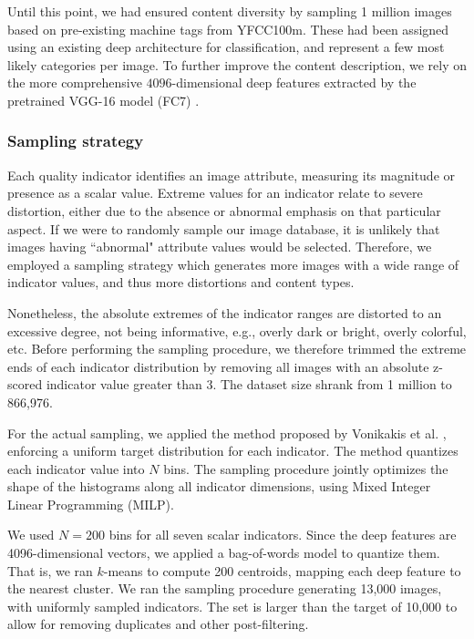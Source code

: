 \documentclass{article}
\begin{document}
Until this point, we had ensured content diversity by sampling 1 million images based on pre-existing machine tags from YFCC100m. These had been assigned using an existing deep architecture for classification, and represent a few most likely categories per image. To further improve the content description, we rely on the more comprehensive $4096$-dimensional deep features extracted by the pretrained VGG-16 model (FC7) \cite{Simonyan:14c}.





\subsubsection{Sampling strategy}
Each quality indicator identifies an image attribute, measuring its magnitude or presence as a scalar value. Extreme values for an indicator relate to severe distortion, either due to the absence or abnormal emphasis on that particular aspect. If we were to randomly sample our image database, it is unlikely that images having ``abnormal" attribute values would be selected. Therefore, we employed a sampling strategy which generates more images with a wide range of indicator values, and thus more distortions and content types.

Nonetheless, the absolute extremes of the indicator ranges are distorted to an excessive degree, not being informative, e.g., overly dark or bright, overly colorful, etc. Before performing the sampling procedure, we therefore trimmed the extreme ends of each indicator distribution by removing all images with an absolute z-scored indicator value greater than 3. The dataset size shrank from 1 million to 866,976.

For the actual sampling, we applied the method proposed by Vonikakis et al. \cite{vonikakis2016shaping}, enforcing a uniform target distribution for each indicator. The method quantizes each indicator value into $N$ bins. The sampling procedure jointly optimizes the shape of the histograms along all indicator dimensions, using Mixed Integer Linear Programming (MILP).

We used $N=200$ bins for all seven scalar indicators. Since the deep features are 4096-dimensional vectors, we applied a bag-of-words model to quantize them. That is, we ran $k$-means to compute 200 centroids, mapping each deep feature to the nearest cluster. We ran the sampling procedure generating 13,000 images, with uniformly sampled indicators. The set is larger than the target of 10,000 to allow for removing duplicates and other post-filtering. 
\end{document}
